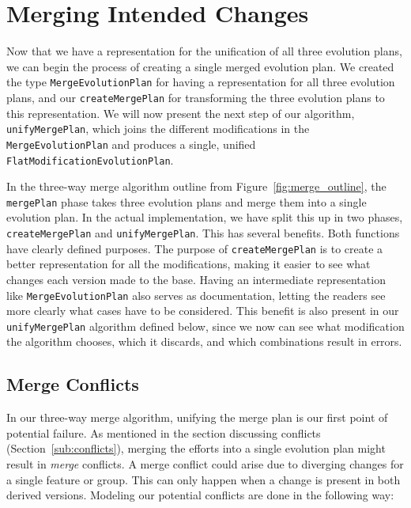 \documentclass[a4paper,english]{ifimaster}
\begin{document}
\section{Merging Intended Changes}%
\label{sec:merging_intended_changes}

Now that we have a representation for the unification of all three evolution plans, we can begin the process of creating a single merged evolution plan. We created the type \texttt{Merge\-Evolution\-Plan} for having a representation for all three evolution plans, and our \texttt{create\-Merge\-Plan} for transforming the three evolution plans to this representation. We will now present the next step of our algorithm, \texttt{unify\-Merge\-Plan}, which joins the different modifications in the \texttt{Merge\-Evolution\-Plan} and produces a single, unified \texttt{Flat\-Modification\-Evolution\-Plan}.

In the three-way merge algorithm outline from Figure~\vref{fig:merge_outline}, the \texttt{mergePlan} phase takes three evolution plans and merge them into a single evolution plan. In the actual implementation, we have split this up in two phases, \texttt{create\-Merge\-Plan} and \texttt{unify\-Merge\-Plan}. This has several benefits. Both functions have clearly defined purposes. The purpose of \texttt{create\-Merge\-Plan} is to create a better representation for all the modifications, making it easier to see what changes each version made to the base. Having an intermediate representation like \texttt{Merge\-Evolution\-Plan} also serves as documentation, letting the readers see more clearly what cases have to be considered. This benefit is also present in our \texttt{unify\-Merge\-Plan} algorithm defined below, since we now can see what modification the algorithm chooses, which it discards, and which combinations result in errors.

\subsection{Merge Conflicts}%
\label{sub:merge_errors}

In our three-way merge algorithm, unifying the merge plan is our first point of potential failure. As mentioned in the section discussing conflicts (Section~\vref{sub:conflicts}), merging the efforts into a single evolution plan might result in \textit{merge} conflicts. A merge conflict could arise due to diverging changes for a single feature or group. This can only happen when a change is present in both derived versions. Modeling our potential conflicts are done in the following way:
\end{document}
